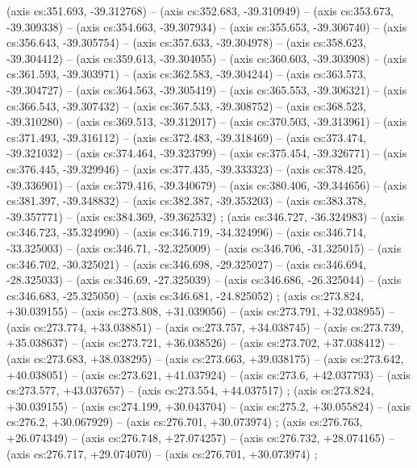     (axis cs:351.693,    -39.312768) --  (axis cs:352.683,    -39.310949) --  (axis cs:353.673,    -39.309338) --  (axis cs:354.663,    -39.307934) --  (axis cs:355.653,    -39.306740) --  (axis cs:356.643,    -39.305754) --  (axis cs:357.633,    -39.304978) --  (axis cs:358.623,    -39.304412) --  (axis cs:359.613,    -39.304055) --  (axis cs:360.603,    -39.303908) --  (axis cs:361.593,    -39.303971) --  (axis cs:362.583,    -39.304244) --  (axis cs:363.573,    -39.304727) --  (axis cs:364.563,    -39.305419) --  (axis cs:365.553,    -39.306321) --  (axis cs:366.543,    -39.307432) --  (axis cs:367.533,    -39.308752) --  (axis cs:368.523,    -39.310280) --  (axis cs:369.513,    -39.312017) --  (axis cs:370.503,    -39.313961) --  (axis cs:371.493,    -39.316112) --  (axis cs:372.483,    -39.318469) --  (axis cs:373.474,    -39.321032) --  (axis cs:374.464,    -39.323799) --  (axis cs:375.454,    -39.326771) --  (axis cs:376.445,    -39.329946) --  (axis cs:377.435,    -39.333323) --  (axis cs:378.425,    -39.336901) --  (axis cs:379.416,    -39.340679) --  (axis cs:380.406,    -39.344656) --  (axis cs:381.397,    -39.348832) --  (axis cs:382.387,    -39.353203) --  (axis cs:383.378,    -39.357771) --  (axis cs:384.369,    -39.362532) ;
    (axis cs:346.727,    -36.324983) --  (axis cs:346.723,    -35.324990) --  (axis cs:346.719,    -34.324996) --  (axis cs:346.714,    -33.325003) --  (axis cs:346.71,    -32.325009) --  (axis cs:346.706,    -31.325015) --  (axis cs:346.702,    -30.325021) --  (axis cs:346.698,    -29.325027) --  (axis cs:346.694,    -28.325033) --  (axis cs:346.69,    -27.325039) --  (axis cs:346.686,    -26.325044) --  (axis cs:346.683,    -25.325050) --  (axis cs:346.681,    -24.825052) ;
    (axis cs:273.824,    +30.039155) --  (axis cs:273.808,    +31.039056) --  (axis cs:273.791,    +32.038955) --  (axis cs:273.774,    +33.038851) --  (axis cs:273.757,    +34.038745) --  (axis cs:273.739,    +35.038637) --  (axis cs:273.721,    +36.038526) --  (axis cs:273.702,    +37.038412) --  (axis cs:273.683,    +38.038295) --  (axis cs:273.663,    +39.038175) --  (axis cs:273.642,    +40.038051) --  (axis cs:273.621,    +41.037924) --  (axis cs:273.6,    +42.037793) --  (axis cs:273.577,    +43.037657) --  (axis cs:273.554,    +44.037517) ;
    (axis cs:273.824,    +30.039155) --  (axis cs:274.199,    +30.043704) --  (axis cs:275.2,    +30.055824) --  (axis cs:276.2,    +30.067929) --  (axis cs:276.701,    +30.073974) ;
    (axis cs:276.763,    +26.074349) --  (axis cs:276.748,    +27.074257) --  (axis cs:276.732,    +28.074165) --  (axis cs:276.717,    +29.074070) --  (axis cs:276.701,    +30.073974) ;

